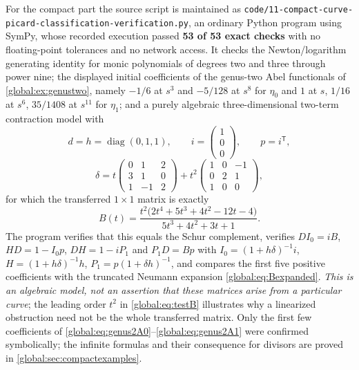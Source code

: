 \documentclass[11pt,letterpaper]{article}
\theoremstyle{definition}
\theoremstyle{remark}
\numberwithin{equation}{section}
\begin{document}
For the compact part the source script is maintained as \nolinkurl{code/11-compact-curve-picard-classification-verification.py}, an ordinary Python program using SymPy, whose recorded execution passed \textbf{53 of 53 exact checks} with no floating-point tolerances and no network access. It checks the Newton/logarithm generating identity for monic polynomials of degrees two and three through power nine; the displayed initial coefficients of the genus-two Abel functionals of \cref{global:ex:genustwo}, namely $-1/6$ at $s^3$ and $-5/128$ at $s^8$ for $\eta_0$ and $1$ at $s$, $1/16$ at $s^6$, $35/1408$ at $s^{11}$ for $\eta_1$; and a purely algebraic three-dimensional two-term contraction model with
\[
  d=h=\operatorname{diag}(0,1,1),\qquad
  i=\begin{pmatrix}1\\0\\0\end{pmatrix},\qquad p=i^{\mathsf T},
\]
\[
  \delta=t\begin{pmatrix}0&1&2\\3&1&0\\1&-1&2\end{pmatrix}
       +t^2\begin{pmatrix}1&0&-1\\0&2&1\\1&0&0\end{pmatrix},
\]
for which the transferred $1\times1$ matrix is exactly
\begin{equation}\label{global:eq:testB}
  B(t)=\frac{t^2\bigl(2t^4+5t^3+4t^2-12t-4\bigr)}{5t^3+4t^2+3t+1}.
\end{equation}
The program verifies that this equals the Schur complement, verifies $DI_0=iB$, $HD=1-I_0p$, $DH=1-iP_1$ and $P_1D=Bp$ with $I_0=(1+h\delta)^{-1}i$, $H=(1+h\delta)^{-1}h$, $P_1=p(1+\delta h)^{-1}$, and compares the first five positive coefficients with the truncated Neumann expansion \eqref{global:eq:Bexpanded}. \emph{This is an algebraic model, not an assertion that these matrices arise from a particular curve}; the leading order $t^2$ in \eqref{global:eq:testB} illustrates why a linearized obstruction need not be the whole transferred matrix. Only the first few coefficients of \eqref{global:eq:genus2A0}--\eqref{global:eq:genus2A1} were confirmed symbolically; the infinite formulas and their consequence for divisors are proved in \cref{global:sec:compactexamples}.
\end{document}
